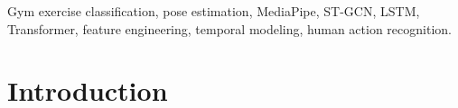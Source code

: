 \documentclass[journal,onecolumn, 11pt]{IEEEtran}
\begin{document}
\begin{IEEEkeywords}
Gym exercise classification, pose estimation, MediaPipe, ST-GCN, LSTM, Transformer, feature engineering, temporal modeling, human action recognition.
\end{IEEEkeywords}






%
\IEEEpeerreviewmaketitle



\section{Introduction}
% 
% 
% 
% 

 

\end{document}
